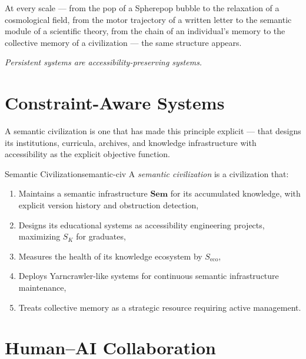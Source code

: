 At every scale — from the pop of a Spherepop bubble to the relaxation
of a cosmological field, from the motor trajectory of a written letter
to the semantic module of a scientific theory, from the chain of an
individual's memory to the collective memory of a civilization — the
same structure appears.

\emph{Persistent systems are accessibility-preserving systems.}

\section{Constraint-Aware Systems}

A semantic civilization is one that has made this principle explicit —
that designs its institutions, curricula, archives, and knowledge
infrastructure with accessibility as the explicit objective function.

\begin{definition}{Semantic Civilization}{semantic-civ}
  A \emph{semantic civilization} is a civilization that:
  \begin{enumerate}
    \item Maintains a semantic infrastructure $\mathbf{Sem}$ for its
          accumulated knowledge, with explicit version history and
          obstruction detection,
    \item Designs its educational systems as accessibility engineering
          projects, maximizing $S_K$ for graduates,
    \item Measures the health of its knowledge ecosystem by $S_\text{eco}$,
    \item Deploys Yarncrawler-like systems for continuous semantic
          infrastructure maintenance,
    \item Treats collective memory as a strategic resource requiring
          active management.
  \end{enumerate}
\end{definition}

\section{Human–AI Collaboration}

